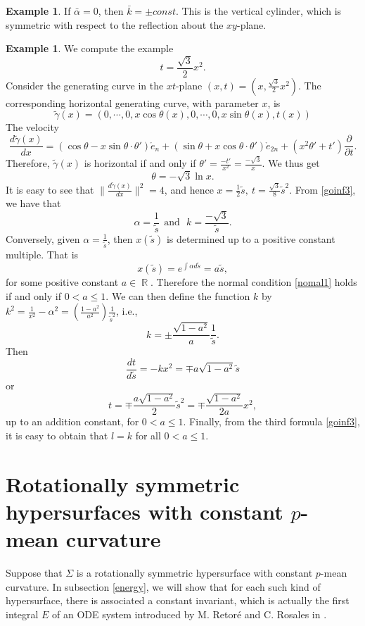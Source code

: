 \documentclass[12pt]{amsart}
\theoremstyle{definition}\newtheorem{exa}[thm]{\sc Example}
\theoremstyle{definition}\newtheorem{de}[thm]{\sc Definition}
\theoremstyle{definition}\newtheorem{rem}[thm]{\sc Remark}
\theoremstyle{definition}\newtheorem{prob}[thm]{\it Problem}
\theoremstyle{definition}\newtheorem{fact}[thm]{\sc Fact}
\theoremstyle{definition}\newtheorem{claim}[thm]{\sc Claim}
\numberwithin{equation}{section}
\DeclareMathOperator{\R}{\mathbb R}
\begin{document}
\begin{exa}
If $\bar\alpha=0$, then $\bar k=\pm const$. This is the vertical cylinder, which is symmetric with respect to the reflection about the $xy$-plane. 
\end{exa}

\begin{exa}
We compute the example
\[t=\frac{\sqrt{3}}{2}x^{2}.\]
Consider the generating curve in the $xt$-plane $(x,t)=(x,\frac{\sqrt{3}}{2}x^{2})$. The corresponding horizontal generating curve, with parameter $x$, is
\[\tilde{\gamma}(x)=(0,\cdots,0,x\cos{\theta(x)},0,\cdots,0,x\sin{\theta(x)},t(x))\] 
The velocity
\[\frac{d\tilde{\gamma}(x)}{dx}=(\cos{\theta}-x\sin{\theta}\cdot\theta')\mathring{e}_{n}+(\sin{\theta}+x\cos{\theta}\cdot\theta')\mathring{e}_{2n}+(x^2\theta'+t')\frac{\partial}{\partial t}.\]
Therefore, $\tilde{\gamma}(x)$ is horizontal if and only if $\theta'=\frac{-t'}{x^2}=\frac{-\sqrt{3}}{x}$.
We thus get \[\theta=-\sqrt{3}\ln{x}.\]
It is easy to see that $\|\frac{d\tilde{\gamma}(x)}{dx}\|^2=4$, and hence $x=\frac{1}{2}\tilde{s},\ t=\frac{\sqrt{3}}{8}\tilde{s}^2$. From \eqref{goinf3}, we have that 
\[\alpha=\frac{1}{\tilde{s}}\ \ \textrm{and}\ \ \ k=\frac{-\sqrt{3}}{\tilde{s}}.\]
Conversely, given $\alpha=\frac{1}{\tilde{s}}$, then $x(\tilde{s})$ is determined up to a positive constant multiple. That is
\[x(\tilde{s})=e^{\int\alpha d\tilde{s}}=a\tilde{s},\]
for some positive constant $a\in\R$. Therefore the normal condition \eqref{nomal1} holds if and only if $0<a\leq 1$. We can then define the function $k$ by $k^{2}=\frac{1}{x^2}-\alpha^2=\left(\frac{1-a^2}{a^2}\right)\frac{1}{\tilde{s}^2}$, i.e.,
\[k=\pm\frac{\sqrt{1-a^2}}{a}\frac{1}{\tilde{s}}.\]
Then
\[\frac{dt}{d\tilde{s}}=-kx^2=\mp a\sqrt{1-a^2}\tilde{s}\]
or
\[t=\mp \frac{a\sqrt{1-a^2}}{2}\tilde{s}^2=\mp \frac{\sqrt{1-a^2}}{2a}x^2,\]
up to an addition constant, for $0<a\leq 1$. Finally, from the third formula \eqref{goinf3}, it is easy to obtain that $l=k$ for all $0<a\leq 1$.
\end{exa}

\section{Rotationally symmetric hypersurfaces with constant $p$-mean curvature}
Suppose that $\Sigma$ is a rotationally symmetric hypersurface with constant $p$-mean curvature. In subsection \ref{energy}, we will show that for each such kind of hypersurface, there is associated a constant invariant, which is actually the first integral $E$ of an ODE system introduced by M. Retor\'e and C. Rosales in \cite{RR}.
\end{document}
